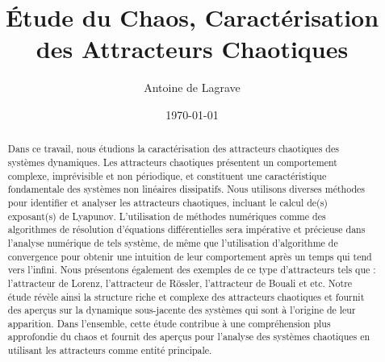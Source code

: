 \documentclass[a4paper, amsfonts, amssymb, amsmath, reprint, showkeys,
nofootinbib, twoside]{revtex4-2}
\begin{document}
    \title{Étude du Chaos, Caractérisation des Attracteurs Chaotiques}

    \author{Antoine de Lagrave}
    \date{\today}

    \begin{abstract}
        Dans ce travail, nous étudions la caractérisation des attracteurs
        chaotiques des systèmes dynamiques. Les attracteurs chaotiques
        présentent un comportement complexe, imprévisible et non périodique,
        et constituent une caractéristique fondamentale des systèmes non
        linéaires dissipatifs. Nous utilisons diverses méthodes pour
        identifier et analyser les attracteurs chaotiques, incluant le calcul
        de(s) exposant(s) de Lyapunov. L'utilisation de méthodes numériques
        comme des algorithmes de résolution d'équations différentielles sera
        impérative et précieuse dans l'analyse numérique de tels système, de
        même que l'utilisation d'algorithme de convergence pour obtenir une
        intuition de leur comportement après un temps qui tend vers l'infini.
        Nous présentons également des exemples de ce type d'attracteurs tels
        que : l'attracteur de Lorenz, l'attracteur de Rössler, l'attracteur de
        Bouali et etc. Notre étude révèle ainsi la structure riche et complexe
        des attracteurs chaotiques et fournit des aperçus sur la dynamique
        sous-jacente des systèmes qui sont à l'origine de leur apparition.
        Dans l'ensemble, cette étude contribue à une compréhension plus
        approfondie du chaos et fournit des aperçus pour l'analyse des
        systèmes chaotiques en utilisant les attracteurs comme entité
        principale.
    \end{abstract}

    \maketitle

    

    

    

    

    

    \appendix
    

    

    
\end{document}
